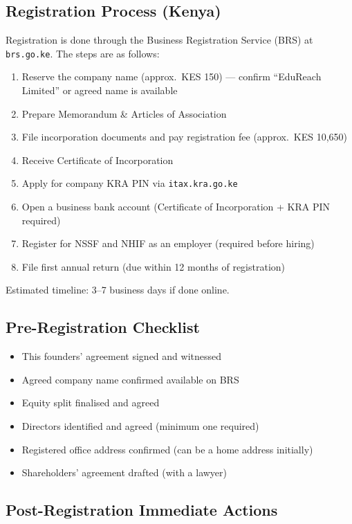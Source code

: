 \documentclass[12pt,a4paper]{article}
\newcommand{\cb}{$\square$\;}                   %
\begin{document}
\subsection{Registration Process (Kenya)}

Registration is done through the Business Registration Service (BRS) at \texttt{brs.go.ke}. The steps are as follows:

\begin{enumerate}
  \item Reserve the company name (approx.\ KES 150) --- confirm ``EduReach Limited'' or agreed name is available
  \item Prepare Memorandum \& Articles of Association
  \item File incorporation documents and pay registration fee (approx.\ KES 10{,}650)
  \item Receive Certificate of Incorporation
  \item Apply for company KRA PIN via \texttt{itax.kra.go.ke}
  \item Open a business bank account (Certificate of Incorporation + KRA PIN required)
  \item Register for NSSF and NHIF as an employer (required before hiring)
  \item File first annual return (due within 12 months of registration)
\end{enumerate}

Estimated timeline: 3--7 business days if done online.

\subsection{Pre-Registration Checklist}

\begin{itemize}[label=\cb]
  \item This founders' agreement signed and witnessed
  \item Agreed company name confirmed available on BRS
  \item Equity split finalised and agreed
  \item Directors identified and agreed (minimum one required)
  \item Registered office address confirmed (can be a home address initially)
  \item Shareholders' agreement drafted (with a lawyer)
\end{itemize}

\subsection{Post-Registration Immediate Actions}
\end{document}
